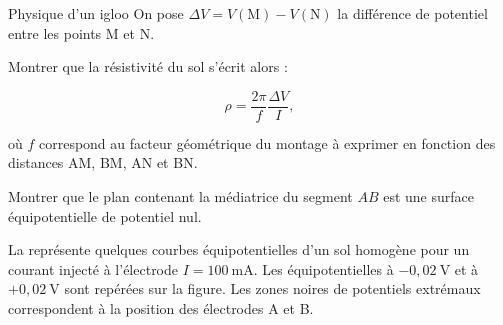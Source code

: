 \begin{exo}[PC][1][devoir]{Physique d'un igloo}
On pose $\Delta V=V(\mathrm{M})-V(\mathrm{N})$ la différence de potentiel entre les points $\mathrm{M}$ et $\mathrm{N}$.



\begin{quest}
  \item
  Montrer que la résistivité du sol s'écrit alors :

  $$
  \rho=\frac{2 \pi}{f} \frac{\Delta V}{I},
  $$

  où $f$ correspond au facteur géométrique du montage à exprimer en fonction des distances AM, BM, AN et BN.


  \item
 Montrer que le plan contenant la médiatrice du segment $A B$ est une surface équipotentielle de potentiel nul.
\end{quest}

La  représente quelques courbes équipotentielles d'un sol homogène pour un courant injecté à l'électrode $I=100 \mathrm{~mA}$. Les équipotentielles à $-0,02 \mathrm{~V}$ et à $+0,02 \mathrm{~V}$ sont repérées sur la figure. Les zones noires de potentiels extrémaux correspondent à la position des électrodes A et B.


\end{exo}
